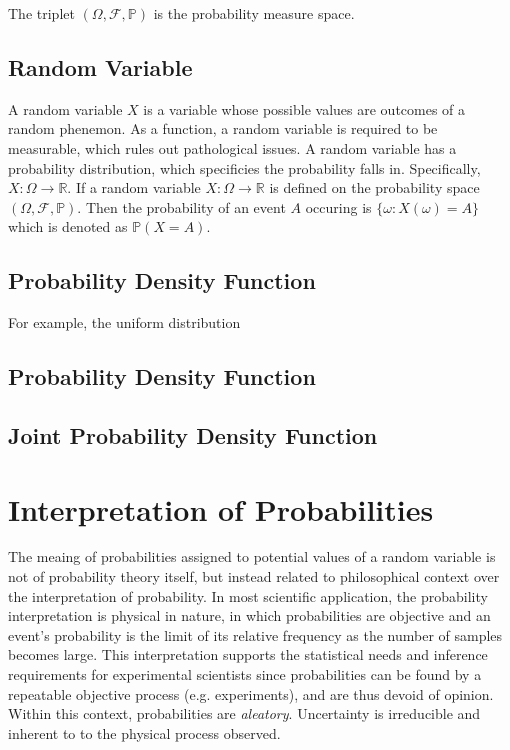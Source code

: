 The triplet $(\Omega,\mathcal{F},\mathbb{P})$ is the probability measure space.

\subsection{Random Variable}
A random variable $X$ is a variable whose possible values are outcomes of a random phenemon.  As a function, a random variable is required to be measurable, which rules out pathological issues.  A random variable has a probability distribution, which specificies the probability falls in.  Specifically, $X:\Omega\rightarrow\mathbb{R}$.  If a random variable $X:\Omega \rightarrow \mathbb{R}$ is defined on the probability space $(\Omega,\mathcal{F},\mathbb{P})$.  Then the probability of an event $A$ occuring is $\{\omega:X(\omega)=A\}$ which is denoted as $\mathbb{P}(X=A)$.

\subsection{Probability Density Function}

For example, the uniform distribution

\subsection{Probability Density Function}

\subsection{Joint Probability Density Function}

\section{Interpretation of Probabilities}

The meaing of probabilities assigned to potential values of a random variable is not of probability theory itself, but instead related to philosophical context over the interpretation of probability.  In most scientific application, the probability interpretation is physical in nature, in which probabilities are objective and an event's probability is the limit of its relative frequency as the number of samples becomes large.  This interpretation supports the statistical needs and inference requirements for experimental scientists since probabilities can be found by a repeatable objective process (e.g. experiments), and are thus devoid of opinion.  Within this context, probabilities are \emph{aleatory}.  Uncertainty is irreducible and inherent to to the physical process observed.

